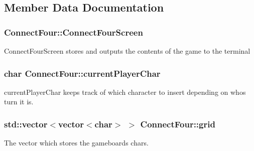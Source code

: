 \subsection{Member Data Documentation}
\hypertarget{classConnectFour_a7548207e4c83260233e8d3668ae3e7e2}{
\subsubsection[{Connect\-Four\-Screen}]{ Connect\-Four\-::\-Connect\-Four\-Screen\hspace{0.3cm}{\ttfamily [private]}}}\label{classConnectFour_a7548207e4c83260233e8d3668ae3e7e2}
Connect\-Four\-Screen stores and outputs the contents of the game to the terminal \hypertarget{classConnectFour_adc938d715dbe28efc1db3b4a1dc866cb}{
\subsubsection[{current\-Player\-Char}]{\setlength{\rightskip}{0pt plus 5cm}char Connect\-Four\-::current\-Player\-Char\hspace{0.3cm}{\ttfamily [private]}}}\label{classConnectFour_adc938d715dbe28efc1db3b4a1dc866cb}
current\-Player\-Char keeps track of which character to insert depending on whos turn it is. \hypertarget{classConnectFour_add9742cf2d2ffd9524d454762dbd3154}{
\subsubsection[{grid}]{\setlength{\rightskip}{0pt plus 5cm}std\-::vector$<$vector$<$char$>$ $>$ Connect\-Four\-::grid\hspace{0.3cm}{\ttfamily [private]}}}\label{classConnectFour_add9742cf2d2ffd9524d454762dbd3154}


The vector which stores the gameboards chars. 

